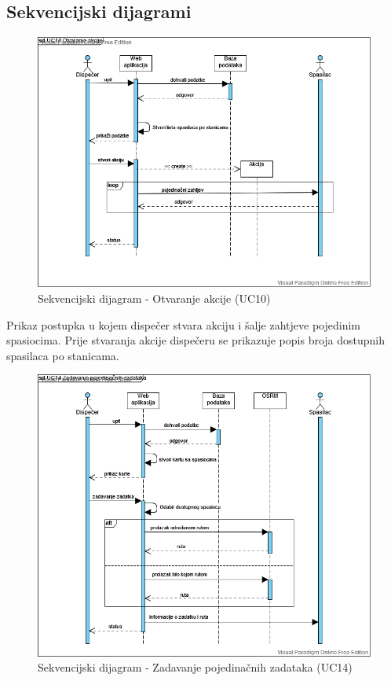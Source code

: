 			\subsection{Sekvencijski dijagrami}
				
				\begin{figure}[H]
					\includegraphics[scale=0.5]{slike/dispatcher_sequence.PNG}
					\centering
					\caption{Sekvencijski dijagram - Otvaranje akcije (UC10)}
					\label{fig:UC10}
				\end{figure}
			
				Prikaz postupka u kojem dispečer stvara akciju i šalje zahtjeve pojedinim spasiocima. Prije stvaranja akcije
				dispečeru se prikazuje popis broja dostupnih spasilaca po stanicama.
			
				\begin{figure}[H]
					\includegraphics[scale=0.5]{slike/zadavanje_zadataka.png}
					\centering
					\caption{Sekvencijski dijagram - Zadavanje pojedinačnih zadataka (UC14)}
					\label{fig:UC14}
				\end{figure}
				
